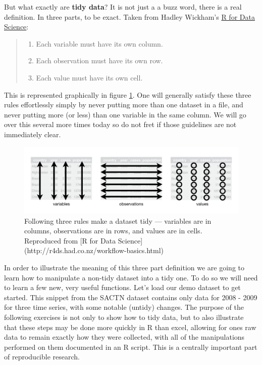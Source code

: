 \documentclass[]{book}
\providecommand{\tightlist}{%
  \setlength{\itemsep}{0pt}\setlength{\parskip}{0pt}}
\theoremstyle{definition}
\theoremstyle{definition}
\theoremstyle{definition}
\theoremstyle{remark}
\begin{document}
But what exactly are \textbf{tidy data}? It is not just a a buzz word,
there is a real definition. In three parts, to be exact. Taken from
Hadley Wickham's \href{http://r4ds.had.co.nz/workflow-basics.html}{R for
Data Science}:

\begin{quote}
\begin{enumerate}
\def\labelenumi{\arabic{enumi}.}
\tightlist
\item
  Each variable must have its own column.\\
\item
  Each observation must have its own row.\\
\item
  Each value must have its own cell.
\end{enumerate}
\end{quote}

This is represented graphically in figure \ref{fig:tidy-structure}. One
will generally satisfy these three rules effortlessly simply by never
putting more than one dataset in a file, and never putting more (or
less) than one variable in the same column. We will go over this several
more times today so do not fret if those guidelines are not immediately
clear.

\begin{figure}

{\centering \includegraphics[width=1\linewidth]{figures/tidy-1} 

}

\caption{Following three rules make a dataset tidy --- variables are in columns, observations are in rows, and values are in cells. Reproduced from [R for Data Science](http://r4ds.had.co.nz/workflow-basics.html)}\label{fig:tidy-structure}
\end{figure}

In order to illustrate the meaning of this three part definition we are
going to learn how to manipulate a non-tidy dataset into a tidy one. To
do so we will need to learn a few new, very useful functions. Let's load
our demo dataset to get started. This snippet from the SACTN dataset
contains only data for 2008 - 2009 for three time series, with some
notable (untidy) changes. The purpose of the following exercises is not
only to show how to tidy data, but to also illustrate that these steps
may be done more quickly in R than excel, allowing for ones raw data to
remain exactly how they were collected, with all of the manipulations
performed on them documented in an R script. This is a centrally
important part of reproducible research.
\end{document}
